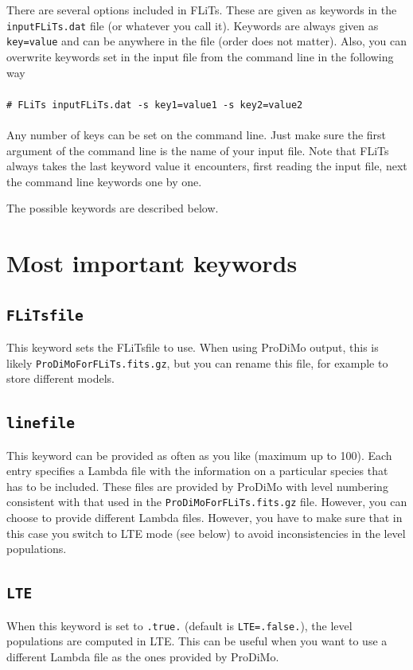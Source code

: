 \documentclass[12pt]{article}
\newcommand{\shellcmd}[1]{\\ \\ \indent\indent\texttt{\# #1}\\ \\ }
\begin{document}
There are several options included in FLiTs. These are given as keywords in the \texttt{inputFLiTs.dat} file (or whatever you call it). Keywords are always given as \texttt{key=value} and can be anywhere in the file (order does not matter). Also, you can overwrite keywords set in the input file from the command line in the following way
%
\shellcmd{FLiTs inputFLiTs.dat -s key1=value1 -s key2=value2}
%
Any number of keys can be set on the command line. Just make sure the first argument of the command line is the name of your input file. Note that FLiTs always takes the last keyword value it encounters, first reading the input file, next the command line keywords one by one.

The possible keywords are described below.

\section{Most important keywords}

\subsection*{\texttt{FLiTsfile}}

This keyword sets the FLiTsfile to use. When using ProDiMo output, this is likely \texttt{ProDiMoForFLiTs.fits.gz}, but you can rename this file, for example to store different models.

\subsection*{\texttt{linefile}}

This keyword can be provided as often as you like (maximum up to 100). Each entry specifies a Lambda file with the information on a particular species that has to be included. These files are provided by ProDiMo with level numbering consistent with that used in the \texttt{ProDiMoForFLiTs.fits.gz} file. However, you can choose to provide different Lambda files. However, you have to make sure that in this case you switch to LTE mode (see below) to avoid inconsistencies in the level populations.

\subsection*{\texttt{LTE}}

When this keyword is set to \texttt{.true.} (default is \texttt{LTE=.false.}), the level populations are computed in LTE. This can be useful when you want to use a different Lambda file as the ones provided by ProDiMo.
\end{document}
